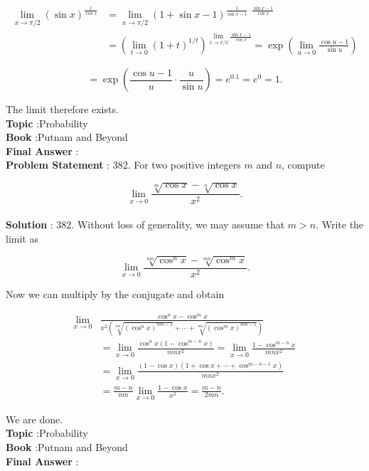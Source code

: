 \documentclass[10pt]{article}
\begin{document}
$$
\begin{aligned}
\lim _{x \rightarrow \pi / 2}(\sin x)^{\frac{1}{\cos x}} &=\lim _{x \rightarrow \pi / 2}(1+\sin x-1)^{\frac{1}{\sin x-1} \cdot \frac{\sin x-1}{\cos x}} \\
&=\left(\lim _{t \rightarrow 0}(1+t)^{1 / t}\right)^{\lim _{x \rightarrow \pi / 2} \frac{\sin x-1}{\cos x}}=\exp \left(\lim _{u \rightarrow 0} \frac{\cos u-1}{\sin u}\right)
\end{aligned}
$$



$$
=\exp \left(\frac{\cos u-1}{u} \cdot \frac{u}{\sin u}\right)=e^{0.1}=e^{0}=1 .
$$

The limit therefore exists.
\\
\textbf{Topic} :Probability\\
\textbf{Book} :Putnam and Beyond\\
\textbf{Final Answer} :\\


\textbf{Problem Statement} :
382. For two positive integers $m$ and $n$, compute

$$
\lim _{x \rightarrow 0} \frac{\sqrt[m]{\cos x}-\sqrt[n]{\cos x}}{x^{2}} .
$$
\\
\textbf{Solution} :
382. Without loss of generality, we may assume that $m>n$. Write the limit as

$$
\lim _{x \rightarrow 0} \frac{\sqrt[m n]{\cos ^{n} x}-\sqrt[m n]{\cos ^{m} x}}{x^{2}} .
$$

Now we can multiply by the conjugate and obtain

$$
\begin{aligned}
\lim _{x \rightarrow 0} & \frac{\cos ^{n} x-\cos ^{m} x}{x^{2}\left(\sqrt[m n]{\left(\cos ^{n} x\right)^{m n-1}}+\cdots+\sqrt[m n]{\left(\cos ^{m} x\right)^{m n-1}}\right)} \\
&=\lim _{x \rightarrow 0} \frac{\cos ^{n} x\left(1-\cos ^{m-n} x\right)}{m n x^{2}}=\lim _{x \rightarrow 0} \frac{1-\cos ^{m-n} x}{m n x^{2}} \\
&=\lim _{x \rightarrow 0} \frac{(1-\cos x)\left(1+\cos x+\cdots+\cos ^{m-n-1} x\right)}{m n x^{2}} \\
&=\frac{m-n}{m n} \lim _{x \rightarrow 0} \frac{1-\cos x}{x^{2}}=\frac{m-n}{2 m n} .
\end{aligned}
$$

We are done.
\\
\textbf{Topic} :Probability\\
\textbf{Book} :Putnam and Beyond\\
\textbf{Final Answer} :\\
\end{document}
